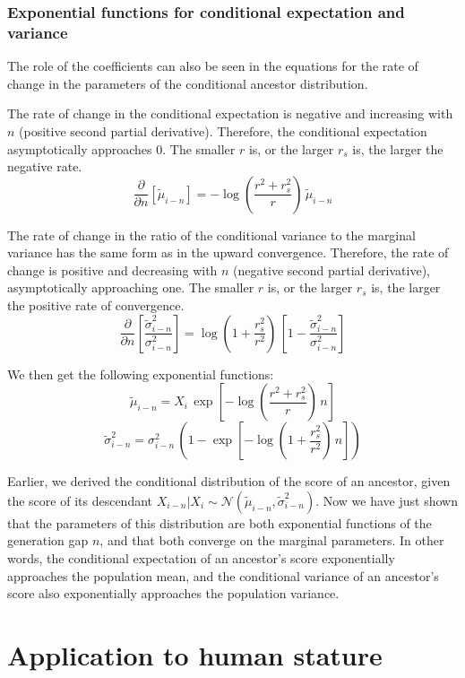 \documentclass[a4paper,11pt]{article} %
\begin{document}
\subsubsection*{Exponential functions for conditional expectation and variance}
The role of the coefficients can also be seen in the equations for the rate of change in the parameters of the conditional ancestor distribution.

The rate of change in the conditional expectation is negative and increasing with $n$ (positive second partial derivative). Therefore, the conditional expectation asymptotically approaches $0$. The smaller $r$ is, or the larger $r_s$ is, the larger the negative rate. 
$$\frac{\partial}{\partial n}[\tilde{\mu}_{i-n}] = -\log(\frac{r^2 + r_s^2}{r}) \, \tilde{\mu}_{i-n}$$

The rate of change in the ratio of the conditional variance to the marginal variance has the same form as in the upward convergence. Therefore, the rate of change is positive and decreasing with $n$ (negative second partial derivative), asymptotically approaching one. The smaller $r$ is, or the larger $r_s$ is, the larger the positive rate of convergence.
$$\frac{\partial }{\partial n}[\frac{\tilde{\sigma}_{i-n}^2}{\sigma_{i-n}^2}] = \log(1+\frac{r_s^2}{r^2}) \, [1 - \frac{\tilde{\sigma}_{i-n}^2}{\sigma_{i-n}^2}]$$

We then get the following exponential functions:
$$\tilde{\mu}_{i-n} = X_i \, \exp[-\log(\frac{r^2 + r_s^2}{r}) \, n]$$
$$\tilde{\sigma}_{i-n}^2 = \sigma_{i-n}^2 \, (1 - \exp[-\log(1+\frac{r_s^2}{r^2}) \, n])$$

Earlier, we derived the conditional distribution of the score of an ancestor, given the score of its descendant $X_{i-n}|X_i \sim \mathcal{N}( \tilde{\mu}_{i-n}, \tilde{\sigma}_{i-n}^2)$. Now we have just shown that the parameters of this distribution are both exponential functions of the generation gap $n$, and that both converge on the marginal parameters. In other words, the conditional expectation of an ancestor's score exponentially approaches the population mean, and the conditional variance of an ancestor's score also exponentially approaches the population variance. 









\section{Application to human stature}
\end{document}
